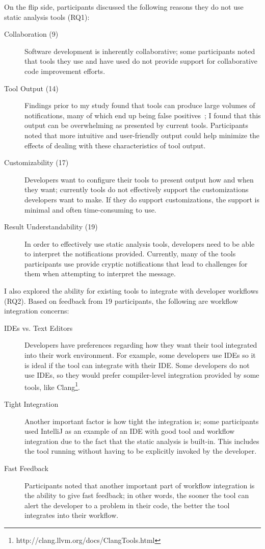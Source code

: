 \documentclass{llncs}
\begin{document}
On the flip side, participants discussed the following reasons they do not use static analysis tools (RQ1): 
\begin{description}
		\item [Collaboration (9)] Software development is inherently collaborative; some participants noted that tools they use and have used do not provide support for collaborative code improvement efforts.
		\item [Tool Output (14)] Findings prior to my study found that tools can produce large volumes of notifications, many of which end up being false positives~\cite{Ayewah:2010:GFF,Shen:2011:EFindBugs}; I found that this output can be overwhelming as presented by current tools. Participants noted that more intuitive and user-friendly output could help minimize the effects of dealing with these characteristics of tool output.
		\item [Customizability (17)] Developers want to configure their tools to present output how and when they want; currently tools do not effectively support the customizations developers want to make. If they do support customizations, the support is minimal and often time-consuming to use.
		\item [Result Understandability (19)] In order to effectively use static analysis tools, developers need to be able to interpret the notifications provided. Currently, many of the tools participants use provide cryptic notifications that lead to challenges for them when attempting to interpret the message.
\end{description}

I also explored the ability for existing tools to integrate with developer workflows (RQ2). Based on feedback from 19 participants, the following are workflow integration concerns:
\begin{description}
	\item[IDEs vs. Text Editors] Developers have preferences regarding how they want their tool integrated into their work environment. For example, some developers use IDEs so it is ideal if the tool can integrate with their IDE. Some developers do not use IDEs, so they would prefer compiler-level integration provided by some tools, like Clang\footnote{http://clang.llvm.org/docs/ClangTools.html}.
	\item[Tight Integration] Another important factor is how tight the integration is; some participants used IntelliJ as an example of an IDE with good tool and workflow integration due to the fact that the static analysis is built-in. This includes the tool running without having to be explicitly invoked by the developer.
	\item [Fast Feedback] Participants noted that another important part of workflow integration is the ability to give fast feedback; in other words, the sooner the tool can alert the developer to a problem in their code, the better the tool integrates into their workflow.
\end{description}
\end{document}
